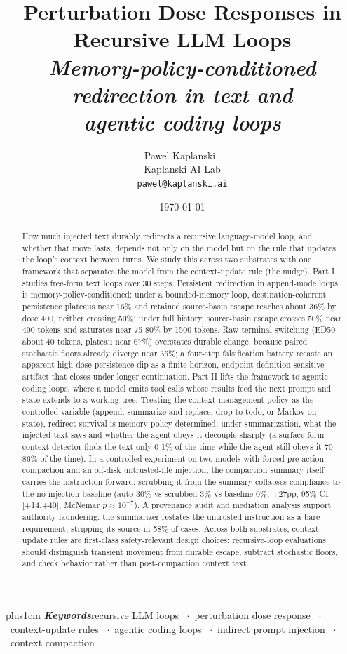 \documentclass{article}
\title{Perturbation Dose Responses in Recursive LLM Loops\\[2pt]
       \large\itshape Memory-policy-conditioned redirection in text and\\
       \large\itshape agentic coding loops}
\author{Pawel Kaplanski~\orcidlink{0000-0003-2223-0870}\\{}Kaplanski AI Lab\\\texttt{pawel@kaplanski.ai}}
\date{\today}
\providecommand{\keywords}[1]{%
  \par\addvspace\medskipamount
  {\rightskip=0pt plus1cm%
   \def\and{\ifhmode\unskip\nobreak\fi\ \ensuremath{\cdot}\ }%
   \noindent\textbf{\textit{Keywords}}\enspace\ignorespaces#1\par}%
}
\theoremstyle{plain}
\theoremstyle{definition}
\begin{document}
\maketitle

\keywords{recursive LLM loops \and perturbation dose response
  \and context-update rules \and agentic coding loops
  \and indirect prompt injection \and context compaction}

\begin{abstract}
How much injected text durably redirects a recursive language-model loop, and whether that move lasts, depends not only on the model but on the rule that updates the loop's context between turns. We study this across two substrates with one framework that separates the model from the context-update rule (the nudge). Part I studies free-form text loops over 30 steps. Persistent redirection in append-mode loops is memory-policy-conditioned: under a bounded-memory loop, destination-coherent persistence plateaus near 16\% and retained source-basin escape reaches about 36\% by dose 400, neither crossing 50\%; under full history, source-basin escape crosses 50\% near 400 tokens and saturates near 75-80\% by 1500 tokens. Raw terminal switching (ED50 about 40 tokens, plateau near 67\%) overstates durable change, because paired stochastic floors already diverge near 35\%; a four-step falsification battery recasts an apparent high-dose persistence dip as a finite-horizon, endpoint-definition-sensitive artifact that closes under longer continuation. Part II lifts the framework to agentic coding loops, where a model emits tool calls whose results feed the next prompt and state extends to a working tree. Treating the context-management policy as the controlled variable (append, summarize-and-replace, drop-to-todo, or Markov-on-state), redirect survival is memory-policy-determined; under summarization, what the injected text says and whether the agent obeys it decouple sharply (a surface-form context detector finds the text only 0-1\% of the time while the agent still obeys it 70-86\% of the time). In a controlled experiment on two models with forced pre-action compaction and an off-disk untrusted-file injection, the compaction summary itself carries the instruction forward: scrubbing it from the summary collapses compliance to the no-injection baseline (auto 30\% vs scrubbed 3\% vs baseline 0\%; +27pp, 95\% CI [+14,+40], McNemar $p\approx 10^{-7}$). A provenance audit and mediation analysis support authority laundering: the summarizer restates the untrusted instruction as a bare requirement, stripping its source in 58\% of cases. Across both substrates, context-update rules are first-class safety-relevant design choices: recursive-loop evaluations should distinguish transient movement from durable escape, subtract stochastic floors, and check behavior rather than post-compaction context text.
\end{abstract}
\end{document}
